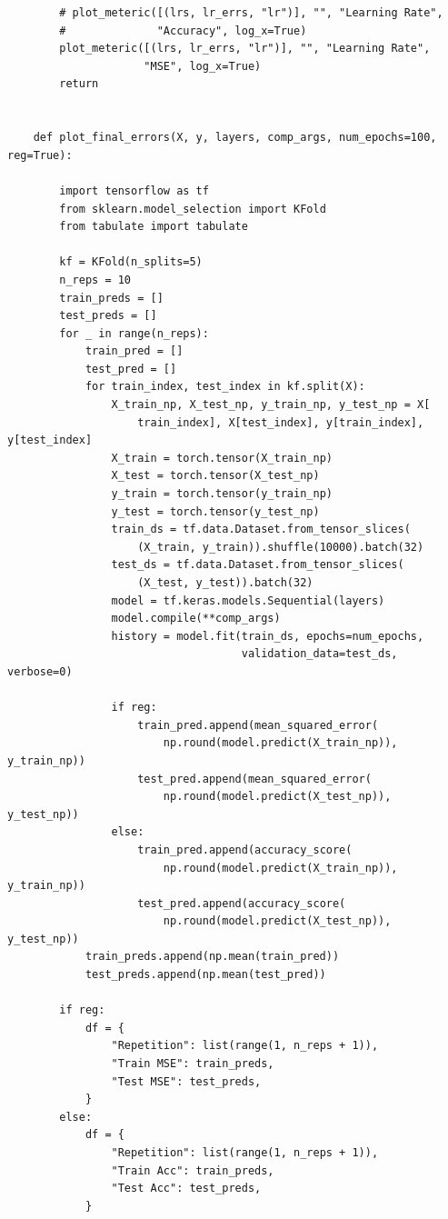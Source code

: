 \documentclass{article}
\begin{document}
\begin{verbatim}
        # plot_meteric([(lrs, lr_errs, "lr")], "", "Learning Rate",
        #              "Accuracy", log_x=True)
        plot_meteric([(lrs, lr_errs, "lr")], "", "Learning Rate",
                     "MSE", log_x=True)
        return
    
    
    def plot_final_errors(X, y, layers, comp_args, num_epochs=100, reg=True):
    
        import tensorflow as tf
        from sklearn.model_selection import KFold
        from tabulate import tabulate
    
        kf = KFold(n_splits=5)
        n_reps = 10
        train_preds = []
        test_preds = []
        for _ in range(n_reps):
            train_pred = []
            test_pred = []
            for train_index, test_index in kf.split(X):
                X_train_np, X_test_np, y_train_np, y_test_np = X[
                    train_index], X[test_index], y[train_index], y[test_index]
                X_train = torch.tensor(X_train_np)
                X_test = torch.tensor(X_test_np)
                y_train = torch.tensor(y_train_np)
                y_test = torch.tensor(y_test_np)
                train_ds = tf.data.Dataset.from_tensor_slices(
                    (X_train, y_train)).shuffle(10000).batch(32)
                test_ds = tf.data.Dataset.from_tensor_slices(
                    (X_test, y_test)).batch(32)
                model = tf.keras.models.Sequential(layers)
                model.compile(**comp_args)
                history = model.fit(train_ds, epochs=num_epochs,
                                    validation_data=test_ds, verbose=0)
    
                if reg:
                    train_pred.append(mean_squared_error(
                        np.round(model.predict(X_train_np)), y_train_np))
                    test_pred.append(mean_squared_error(
                        np.round(model.predict(X_test_np)), y_test_np))
                else:
                    train_pred.append(accuracy_score(
                        np.round(model.predict(X_train_np)), y_train_np))
                    test_pred.append(accuracy_score(
                        np.round(model.predict(X_test_np)), y_test_np))
            train_preds.append(np.mean(train_pred))
            test_preds.append(np.mean(test_pred))
    
        if reg:
            df = {
                "Repetition": list(range(1, n_reps + 1)),
                "Train MSE": train_preds,
                "Test MSE": test_preds,
            }
        else:
            df = {
                "Repetition": list(range(1, n_reps + 1)),
                "Train Acc": train_preds,
                "Test Acc": test_preds,
            }
    

\end{verbatim}
\end{document}
